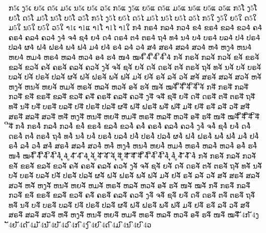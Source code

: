 {%
	ກ5ເ ງ5ເ ຍ5ເ ດ5ເ ມ5ເ ນ5ເ ບ5ເ ວ5ເ
	ກ5ແ ງ5ແ ຍ5ແ ດ5ແ ມ5ແ ນ5ແ ບ5ແ ວ5ແ
	ກ5ໂ ງ5ໂ ຍ5ໂ ດ5ໂ ມ5ໂ ນ5ໂ ບ5ໂ ວ5ໂ
	ກ5ໄ ງ5ໄ ຍ5ໄ ດ5ໄ ມ5ໄ ນ5ໄ ບ5ໄ ວ5ໄ
	ກ5ໃ ງ5ໃ ຍ5ໃ ດ5ໃ ມ5ໃ ນ5ໃ ບ5ໃ ວ5ໃ
	າ1ເ າ1ແ າ1ໂ າ1ໄ າ1ໃ
	ກ4່ ກຣ4່ ກລ4່ ກວ4່ ຂ4່ ຂຣ4່ ຂລ4່ ຂວ4່ ຄ4່ ຄຣ4່ ຄລ4່ ຄວ4່ ງ4່ ຈ4່ ຊ4່ ຍ4່ ດ4່ ດຣ4່ ຕ4່ ຕຣ4່ ຖ4່ ທ4່ ນ4່ ບ4່ ບຣ4່ ບລ4່ ປ4່ ປຣ4່ ປລ4່ ຜ4່ ຝ4່ ຝຣ4່ ພ4່ ຟ4່ ມ4່ ຢ4່ ຣ4່ ລ4່ ວ4່ ສ4່ ສຣ4່ ສລ4່ ສວ4່ ຫ4່ ຫງ4່ ຫນ4່ ຫຍ4່ ຫມ4່ ຫຣ4່ ຫລ4່ ຫວ4່ ອ4່ ຮ4່ ໜ4່ ໝ4່ ຶ4່ ື4່ ິ4່ ີ4່
	ກ4້ ກຣ4້ ກລ4້ ກວ4້ ຂ4້ ຂຣ4້ ຂລ4້ ຂວ4້ ຄ4້ ຄຣ4້ ຄລ4້ ຄວ4້ ງ4້ ຈ4້ ຊ4້ ຍ4້ ດ4້ ດຣ4້ ຕ4້ ຕຣ4້ ຖ4້ ທ4້ ນ4້ ບ4້ ບຣ4້ ບລ4້ ປ4້ ປຣ4້ ປລ4້ ຜ4້ ຝ4້ ຝຣ4້ ພ4້ ຟ4້ ມ4້ ຢ4້ ຣ4້ ລ4້ ວ4້ ສ4້ ສຣ4້ ສລ4້ ສວ4້ ຫ4້ ຫງ4້ ຫນ4້ ຫຍ4້ ຫມ4້ ຫຣ4້ ຫລ4້ ຫວ4້ ອ4້ ຮ4້ ໜ4້ ໝ4້ ຶ4້ ື4້ ິ4້ ີ4້
	ກ4໊ ກຣ4໊ ກລ4໊ ກວ4໊ ຂ4໊ ຂຣ4໊ ຂລ4໊ ຂວ4໊ ຄ4໊ ຄຣ4໊ ຄລ4໊ ຄວ4໊ ງ4໊ ຈ4໊ ຊ4໊ ຍ4໊ ດ4໊ ດຣ4໊ ຕ4໊ ຕຣ4໊ ຖ4໊ ທ4໊ ນ4໊ ບ4໊ ບຣ4໊ ບລ4໊ ປ4໊ ປຣ4໊ ປລ4໊ ຜ4໊ ຝ4໊ ຝຣ4໊ ພ4໊ ຟ4໊ ມ4໊ ຢ4໊ ຣ4໊ ລ4໊ ວ4໊ ສ4໊ ສຣ4໊ ສລ4໊ ສວ4໊ ຫ4໊ ຫງ4໊ ຫນ4໊ ຫຍ4໊ ຫມ4໊ ຫຣ4໊ ຫລ4໊ ຫວ4໊ ອ4໊ ຮ4໊ ໜ4໊ ໝ4໊ ຶ4໊ ື4໊ ິ4໊ ີ4໊
	ກ4໋໋ ກຣ4໋໋ ກລ4໋໋ ກວ4໋໋ ຂ4໋໋ ຂຣ4໋໋ ຂລ4໋໋ ຂວ4໋໋ ຄ4໋໋ ຄຣ4໋໋ ຄລ4໋໋ ຄວ4໋໋ ງ4໋໋ ຈ4໋໋ ຊ4໋໋ ຍ4໋໋ ດ4໋໋ ດຣ4໋໋ ຕ4໋໋ ຕຣ4໋໋ ຖ4໋໋ ທ4໋໋ ນ4໋໋ ບ4໋໋ ບຣ4໋໋ ບລ4໋໋ ປ4໋໋ ປຣ4໋໋ ປລ4໋໋ ຜ4໋໋ ຝ4໋໋ ຝຣ4໋໋ ພ4໋໋ ຟ4໋໋ ມ4໋໋ ຢ4໋໋ ຣ4໋໋ ລ4໋໋ ວ4໋໋ ສ4໋໋ ສຣ4໋໋ ສລ4໋໋ ສວ4໋໋ ຫ4໋໋ ຫງ4໋໋ ຫນ4໋໋ ຫຍ4໋໋ ຫມ4໋໋ ຫຣ4໋໋ ຫລ4໋໋ ຫວ4໋໋ ອ4໋໋ ຮ4໋໋ ໜ4໋໋ ໝ4໋໋ ຶ4໋໋ ື4໋໋ ິ4໋໋ ີ4໋໋
	 ຸ4່ ູ4່ ັ4່ ົ4່
	 ຸ4້ ູ4້ ັ4້ ົ4້
	 ຸ4໊ ູ4໊ ັ4໊ ົ4໊
	 ຶ4໋ ື4໋ ິ4໋ ີ4໋ ຸ4໋ ູ4໋ ັ4໋ ົ4໋
	ກ4ັ ກຣ4ັ ກລ4ັ ກວ4ັ ຂ4ັ ຂຣ4ັ ຂລ4ັ ຂວ4ັ ຄ4ັ ຄຣ4ັ ຄລ4ັ ຄວ4ັ ງ4ັ ຈ4ັ ຊ4ັ ຍ4ັ ດ4ັ ດຣ4ັ ຕ4ັ ຕຣ4ັ ຖ4ັ ທ4ັ ນ4ັ ບ4ັ ບຣ4ັ ບລ4ັ ປ4ັ ປຣ4ັ ປລ4ັ ຜ4ັ ຝ4ັ ຝຣ4ັ ພ4ັ ຟ4ັ ມ4ັ ຢ4ັ ຣ4ັ ລ4ັ ວ4ັ ສ4ັ ສຣ4ັ ສລ4ັ ສວ4ັ ຫ4ັ ຫງ4ັ ຫນ4ັ ຫຍ4ັ ຫມ4ັ ຫຣ4ັ ຫລ4ັ ຫວ4ັ ອ4ັ ຮ4ັ ໜ4ັ ໝ4ັ
	ກ4ົ ກຣ4ົ ກລ4ົ ກວ4ົ ຂ4ົ ຂຣ4ົ ຂລ4ົ ຂວ4ົ ຄ4ົ ຄຣ4ົ ຄລ4ົ ຄວ4ົ ງ4ົ ຈ4ົ ຊ4ົ ຍ4ົ ດ4ົ ດຣ4ົ ຕ4ົ ຕຣ4ົ ຖ4ົ ທ4ົ ນ4ົ ບ4ົ ບຣ4ົ ບລ4ົ ປ4ົ ປຣ4ົ ປລ4ົ ຜ4ົ ຝ4ົ ຝຣ4ົ ພ4ົ ຟ4ົ ມ4ົ ຢ4ົ ຣ4ົ ລ4ົ ວ4ົ ສ4ົ ສຣ4ົ ສລ4ົ ສວ4ົ ຫ4ົ ຫງ4ົ ຫນ4ົ ຫຍ4ົ ຫມ4ົ ຫຣ4ົ ຫລ4ົ ຫວ4ົ ອ4ົ ຮ4ົ ໜ4ົ ໝ4ົ
	ັ4ກ ັ4ງ ັ4ຍ ັ4ດ ັ4ມ ັ4ນ ັ4ບ ັ4ວ
	ົ4ກ ົ4ງ ົ4ຍ ົ4ດ ົ4ມ ົ4ນ ົ4ບ ົ4ວ
}
